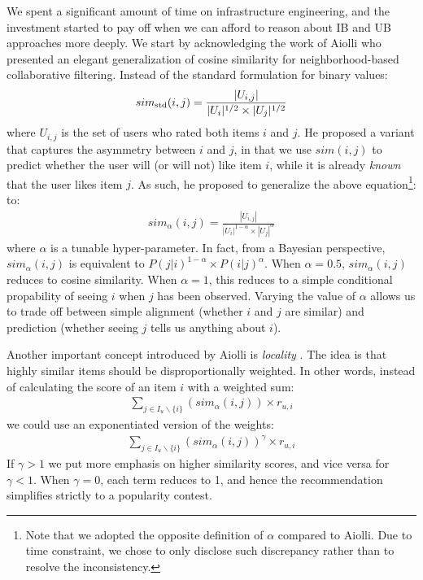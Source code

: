 \documentclass[conference]{IEEEtran}
\begin{document}
We spent a significant amount of time on infrastructure
engineering,
and the investment started to pay off when we can afford to reason about
IB and UB approaches more deeply. We start by acknowledging
the work of Aiolli \cite{aiolli2013efficient} who presented an elegant
generalization of cosine similarity for neighborhood-based collaborative
filtering. Instead of the standard formulation for binary values:
\begin{eqnarray*}
sim_{\rm std}(i,j) = \frac{|U_{i,j}|}{|U_i|^{1/2}\times |U_j|^{1/2}}
\end{eqnarray*}
where $U_{i,j}$ is the set of users who rated both items $i$ and $j$. He
proposed a variant that captures the asymmetry between $i$ and $j$, in
that we use $sim(i,j)$ to predict whether the user will (or will not)
like item $i$, while it is already {\em known} that the user
likes item $j$. As such, he proposed to
generalize the above equation\footnote{Note that we adopted the
opposite definition of $\alpha$ compared to Aiolli. Due to time constraint,
we chose to only disclose such discrepancy rather than to resolve the
inconsistency.}:
 to:
\begin{eqnarray*}
sim_{\alpha}(i,j) = \frac{|U_{i,j}|}{|U_i|^{1-\alpha}\times |U_j|^\alpha}
\end{eqnarray*}
where $\alpha$ is a tunable hyper-parameter.
In fact, from a Bayesian perspective, 
$sim_{\alpha}(i,j)$ is equivalent to
$P(j|i)^{1-\alpha} \times P(i|j)^\alpha$. When $\alpha=0.5$,
$sim_{\alpha}(i,j)$ reduces to cosine similarity. When $\alpha=1$, this
reduces to a simple conditional propability of seeing $i$ when $j$ has
been observed. Varying the value of $\alpha$ allows us to trade off between
simple alignment (whether $i$ and $j$ are similar) and prediction
(whether seeing $j$ tells us anything about $i$).

Another important concept introduced by Aiolli is {\em locality}
\cite{aiolli2013efficient}. The idea is that highly similar items
should be disproportionally weighted. In other words, instead of
calculating the score of an item $i$ with a weighted sum:
\begin{eqnarray*}
\sum_{j\in I_u\backslash\{i\}} \left(sim_{\alpha}(i,j)\right)  \times r_{u,i}
\end{eqnarray*}
we could use an exponentiated version of the weights:
\begin{eqnarray*}
\sum_{j\in I_u\backslash\{i\}}
\left(sim_{\alpha}(i,j)\right)^{\gamma} \times r_{u,i}
\end{eqnarray*}
If $\gamma > 1$ we put more emphasis on higher similarity scores, and
vice versa for $\gamma < 1$. When $\gamma = 0$, each term reduces to 1,
and hence the recommendation simplifies strictly to a popularity contest.
\end{document}
